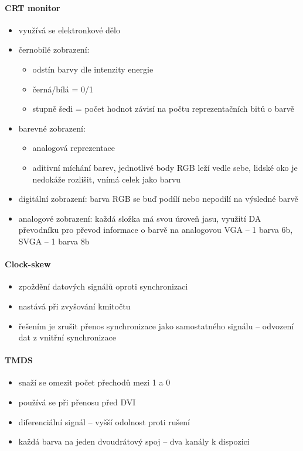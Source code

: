 \documentclass[a5paper,10pt]{article}
\begin{document}
\paragraph{CRT monitor}
\begin{itemize}
	\item využívá se elektronkové dělo
	\item černobílé zobrazení:
	\begin{itemize}
		\item odstín barvy dle intenzity energie
		\item černá/bílá = 0/1
		\item stupně šedi = počet hodnot závisí na počtu reprezentačních bitů o barvě
	\end{itemize}	
	\item barevné zobrazení:
	\begin{itemize}
		\item analogová reprezentace
		\item aditivní míchání barev, jednotlivé body RGB leží vedle sebe, lidské oko je nedokáže rozlišit, vnímá celek jako barvu	
	\end{itemize}
	\item digitální zobrazení: barva RGB se buď podílí nebo nepodílí na výsledné barvě
	\item analogové zobrazení: každá složka má svou úroveň jasu, využití DA převodníku pro převod informace o barvě na analogovou VGA -- 1 barva 6b, SVGA -- 1 barva 8b
\end{itemize}

\paragraph{Clock-skew}
\begin{itemize}
	\item zpoždění datových signálů oproti synchronizaci
	\item nastává při zvyšování kmitočtu
	\item řešením je zrušit přenos synchronizace jako samostatného signálu -- odvození dat z vnitřní synchronizace	
\end{itemize}

\paragraph{TMDS}
\begin{itemize}
	\item snaží se omezit počet přechodů mezi 1 a 0
	\item používá se při přenosu před DVI
	\item diferenciální signál -- vyšší odolnost proti rušení
	\item každá barva na jeden dvoudrátový spoj -- dva kanály k dispozici	
\end{itemize} 
 
\end{document}
